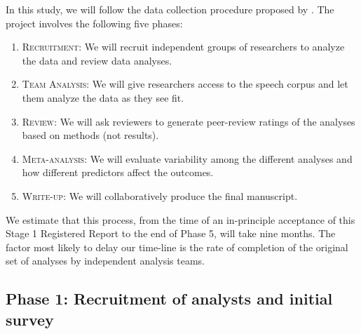 \documentclass[Review,times,sageh]{sagej}
\providecommand{\tightlist}{\setlength{\itemsep}{0pt}\setlength{\parskip}{0pt}}
\begin{document}
In this study, we will follow the data collection procedure proposed by \citet{Parker2020}.
The project involves the following five phases:

\begin{enumerate}
\def\labelenumi{\arabic{enumi}.}
\tightlist
\item
  \textsc{Recruitment}: We will recruit independent groups of researchers to analyze the data and review data analyses.
\item
  \textsc{Team Analysis}: We will give researchers access to the speech corpus and let them analyze the data as they see fit.
\item
  \textsc{Review}: We will ask reviewers to generate peer-review ratings of the analyses based on methods (not results).
\item
  \textsc{Meta-analysis}: We will evaluate variability among the different analyses and how different predictors affect the outcomes.
\item
  \textsc{Write-up}: We will collaboratively produce the final manuscript.
\end{enumerate}

We estimate that this process, from the time of an in-principle acceptance of this Stage 1 Registered Report to the end of Phase 5, will take nine months.
The factor most likely to delay our time-line is the rate of completion of the original set of analyses by independent analysis teams.

\hypertarget{phase-1-recruitment-of-analysts-and-initial-survey}{%
\subsection{Phase 1: Recruitment of analysts and initial survey}\label{phase-1-recruitment-of-analysts-and-initial-survey}}
\end{document}
